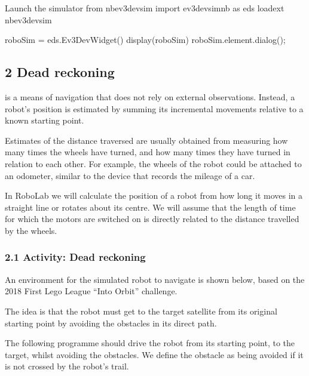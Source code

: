 \documentclass[letterpaper,10pt,english]{sphinxmanual}
\let\sphinxpxdimen\pdfpxdimen\else\newdimen\sphinxpxdimen
\begin{document}
{{\begin{sphinxVerbatim}[commandchars=\\\{\}]
\PYGZsh{}Launch the simulator
from nbev3devsim import ev3devsim\PYGZus{}nb as eds
\PYGZpc{}load\PYGZus{}ext nbev3devsim

roboSim = eds.Ev3DevWidget()
display(roboSim)
roboSim.element.dialog();
\end{sphinxVerbatim}
}


\subsection{2 Dead reckoning}
\label{\detokenize{content/03_Robot_Lab/Section_00_02:2-Dead-reckoning}}\label{\detokenize{content/03_Robot_Lab/Section_00_02::doc}}
 is a means of navigation that does not rely on external observations. Instead, a robot’s position is estimated by summing its incremental movements relative to a known starting point.

Estimates of the distance traversed are usually obtained from measuring how many times the wheels have turned, and how many times they have turned in relation to each other. For example, the wheels of the robot could be attached to an odometer, similar to the device that records the mileage of a car.

In RoboLab we will calculate the position of a robot from how long it moves in a straight line or rotates about its centre. We will assume that the length of time for which the motors are switched on is directly related to the distance travelled by the wheels.


\subsubsection{2.1 Activity: Dead reckoning}
\label{\detokenize{content/03_Robot_Lab/Section_00_02:2.1-Activity:-Dead-reckoning}}
An environment for the simulated robot to navigate is shown below, based on the 2018 First Lego League “Into Orbit” challenge.

The idea is that the robot must get to the target satellite from its original starting point by avoiding the obstacles in its direct path.

\sphinxincludegraphics[width=1714\sphinxpxdimen,height=1020\sphinxpxdimen]{{Section_00_02_-_Jupyter_Notebook}.png}

The following programme should drive the robot from its starting point, to the target, whilst avoiding the obstacles. We define the obstacle as being avoided if it is not crossed by the robot’s  trail.

}
\end{document}
